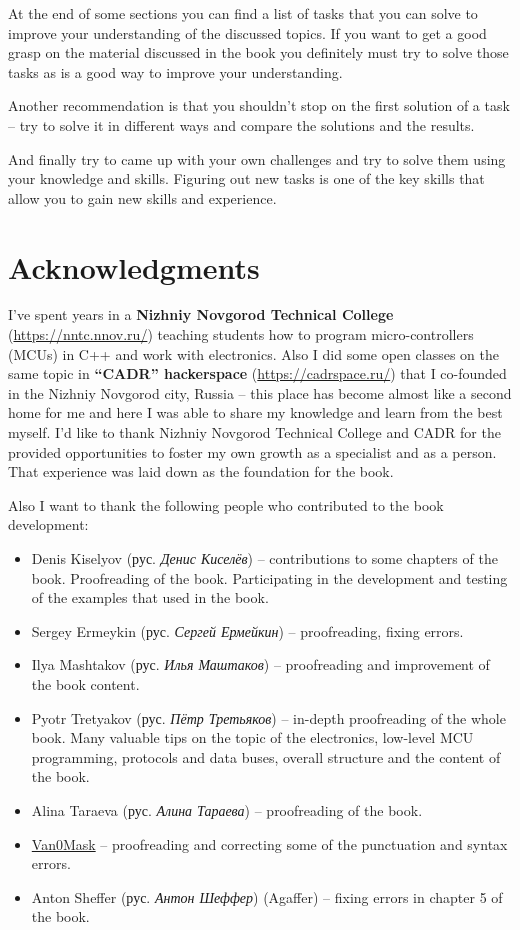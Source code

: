 \documentclass[../sparc.tex]{subfiles}
\begin{document}
At the end of some sections you can find a list of tasks that you can solve to
improve your understanding of the discussed topics.  If you want to get a good
grasp on the material discussed in the book you definitely must try to solve
those tasks as is a good way to improve your understanding.

Another recommendation is that you shouldn't stop on the first solution of a
task -- try to solve it in different ways and compare the solutions and the
results.

And finally try to came up with your own challenges and try to solve them using
your knowledge and skills.  Figuring out new tasks is one of the key skills that
allow you to gain new skills and experience.

\section*{Acknowledgments}

I've spent years in a \textbf{Nizhniy Novgorod Technical College}
(\url{https://nntc.nnov.ru/}) teaching students how to program micro-controllers
(MCUs) in C++ and work with electronics.  Also I did some open classes on the
same topic in \textbf{``CADR'' hackerspace} (\url{https://cadrspace.ru/}) that I
co-founded in the Nizhniy Novgorod city, Russia -- this place has become almost
like a second home for me and here I was able to share my knowledge and learn
from the best myself.  I'd like to thank Nizhniy Novgorod Technical College and
CADR for the provided opportunities to foster my own growth as a specialist and
as a person.  That experience was laid down as the foundation for the book.

Also I want to thank the following people who contributed to the book
development:
\begin{itemize}
\item Denis Kiselyov (рус. \emph{Денис Киселёв}) -- contributions to some
  chapters of the book.  Proofreading of the book.  Participating in the
  development and testing of the examples that used in the book.
\item Sergey Ermeykin (рус. \emph{Сергей Ермейкин}) -- proofreading, fixing
  errors.
\item Ilya Mashtakov (рус. \emph{Илья Маштаков}) – proofreading and improvement
  of the book content.
\item Pyotr Tretyakov (рус. \emph{Пётр Третьяков}) -- in-depth proofreading of
  the whole book.  Many valuable tips on the topic of the electronics, low-level
  MCU programming, protocols and data buses, overall structure and the content
  of the book.
\item Alina Taraeva (рус. \emph{Алина Тараева}) -- proofreading of the book.
\item \href{https://github.com/V4n0M4sk}{Van0Mask} -- proofreading and correcting some of the punctuation and syntax errors.
\item Anton Sheffer (рус. \emph{Антон Шеффер}) (Agaffer) -- fixing errors in
  chapter 5 of the book.
\end{itemize}
\end{document}
